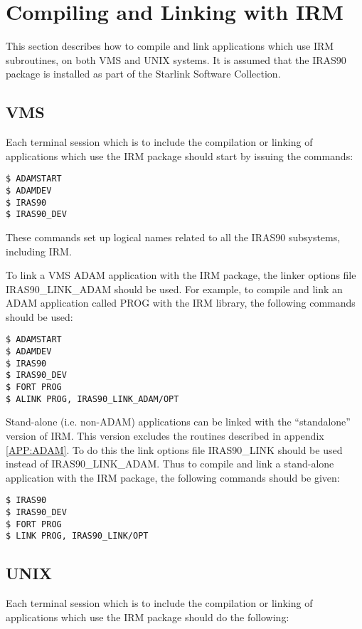 \section {Compiling and Linking with IRM}
\label{SEC:LINK}
This section describes how to compile and link applications which use IRM
subroutines, on both VMS and UNIX systems. It is assumed that the IRAS90 package
is installed as part of the Starlink Software Collection.

\subsection{VMS}
Each terminal session which is to include the compilation or linking of 
applications which use the IRM package should start by issuing the commands:

\begin{verbatim}
$ ADAMSTART
$ ADAMDEV
$ IRAS90
$ IRAS90_DEV
\end{verbatim}

These commands set up logical names related to all the IRAS90
subsystems, including IRM. 

To link a VMS ADAM application with the IRM package, the linker options file
IRAS90\_LINK\_ADAM should be used. For example, to compile and link an ADAM
application called PROG with the IRM library, the following commands should be
used: 

\begin{verbatim}
$ ADAMSTART
$ ADAMDEV
$ IRAS90
$ IRAS90_DEV
$ FORT PROG
$ ALINK PROG, IRAS90_LINK_ADAM/OPT 
\end{verbatim}

Stand-alone (i.e. non-ADAM) applications can be linked with the ``standalone''
version of IRM. This version excludes the routines described in appendix
\ref{APP:ADAM}. To do this the link options file IRAS90\_LINK should be used
instead of IRAS90\_LINK\_ADAM. Thus to compile and link a stand-alone
application with the IRM package, the following commands should be given: 

\begin{verbatim}
$ IRAS90
$ IRAS90_DEV
$ FORT PROG
$ LINK PROG, IRAS90_LINK/OPT 
\end{verbatim}

\subsection{UNIX}

Each terminal session which is to include the compilation or linking of 
applications which use the IRM package should do the following:

